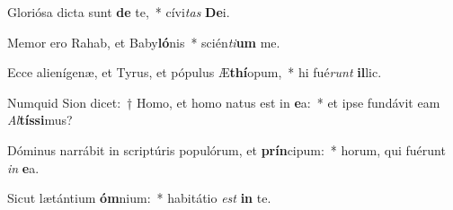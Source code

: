 \item Gloriósa dicta sunt \textbf{de} te,~* cívi\textit{tas} \textbf{De}i.
\item Memor ero Rahab, et Baby\textbf{ló}nis~* scién\textit{ti}\textbf{um} me.
\item Ecce alienígenæ, et Tyrus, et pópulus Æ\textbf{thí}opum,~* hi fué\textit{runt} \textbf{il}lic.
\item Numquid Sion dicet:~† Homo, et homo natus est in \textbf{e}a:~* et ipse fundávit eam \textit{Al}\textbf{tís}\textbf{si}mus?
\item Dóminus narrábit in scriptúris populórum, et \textbf{prín}cipum:~* horum, qui fuérunt \textit{in} \textbf{e}a.
\item Sicut lætántium \textbf{óm}nium:~* habitátio \textit{est} \textbf{in} te.
